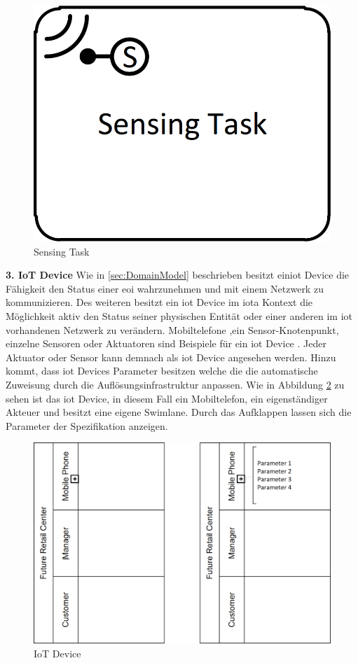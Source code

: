 \documentclass[a4paper, 12pt, twoside, headsepline=true]{scrartcl} %
\begin{document}
\begin{figure}[H]
	\includegraphics[height=2 cm,keepaspectratio,center]{figures/SensingTask}
	\caption{Sensing Task \cite[S.49]{conceptsiotawarepm}}
	\label{fig:sensingtask}
\end{figure} 

\textbf{3. IoT Device}
\newline
Wie in \ref{sec:DomainModel} beschrieben besitzt ein\ac{iot} Device die Fähigkeit den Status einer \ac{eoi} wahrzunehmen und mit einem Netzwerk zu kommunizieren. Des weiteren besitzt ein \ac{iot} Device im \ac{iota} Kontext die Möglichkeit aktiv den Status seiner physischen Entität oder einer anderen im \ac{iot} vorhandenen Netzwerk zu verändern. Mobiltelefone  ,ein Sensor-Knotenpunkt, einzelne Sensoren oder Aktuatoren sind Beispiele für ein \ac{iot} Device \cite[S.50]{conceptsiotawarepm}. Jeder Aktuator oder Sensor kann demnach als \ac{iot} Device angesehen werden. Hinzu kommt, dass \ac{iot} Devices Parameter besitzen welche die die automatische Zuweisung durch die Auflösungsinfrastruktur anpassen. %
Wie in Abbildung \ref{fig:iotdevice} zu sehen ist das \ac{iot} Device, in diesem Fall ein Mobiltelefon, ein eigenständiger Akteuer und besitzt eine eigene Swimlane. Durch das Aufklappen lassen sich die Parameter der Spezifikation anzeigen.

\begin{figure}[H]
	\includegraphics[height=8 cm,keepaspectratio,center]{figures/IoTDevice}
	\caption{IoT Device \cite[S.53]{conceptsiotawarepm}}
	\label{fig:iotdevice}
\end{figure} 
\end{document}
